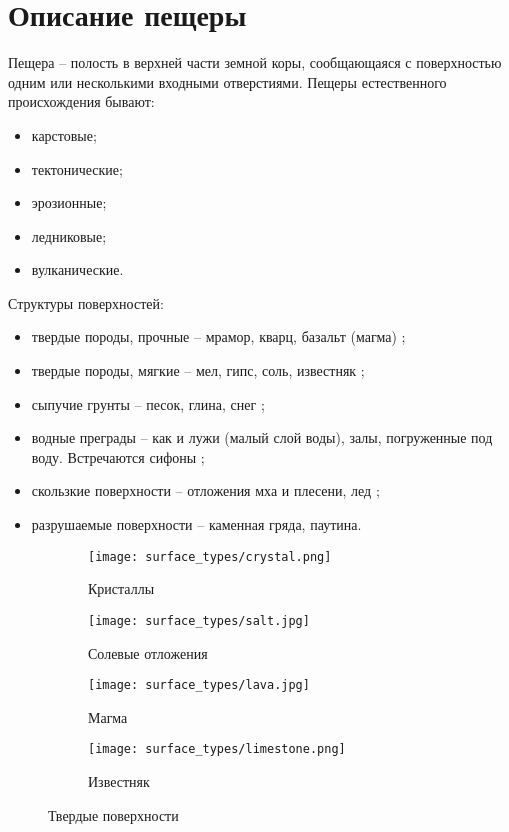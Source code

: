 \section{Описание пещеры}
Пещера -- полость в верхней части земной коры, сообщающаяся с поверхностью одним или несколькими входными отверстиями. Пещеры естественного происхождения бывают:
\begin{itemize}
    \item карстовые; 
    \item тектонические;
    \item эрозионные;
    \item ледниковые;
    \item вулканические.
\end{itemize}

Структуры поверхностей:
\begin{itemize}
    \item твердые породы, прочные -- мрамор, кварц, базальт (магма) ;
    \item твердые породы, мягкие -- мел, гипс, соль, известняк ;
    \item сыпучие грунты -- песок, глина, снег ;
    \item водные преграды -- как и лужи (малый слой воды), залы, погруженные под воду. Встречаются сифоны ;
    \item скользкие поверхности -- отложения мха и плесени, лед ;
    \item разрушаемые поверхности -- каменная гряда, паутина.
\end{itemize}


\begin{figure}[H]
\begin{subfigure}{0.49\textwidth}
\texttt{[image: surface\_types/crystal.png]}\\
\caption{Кристаллы}
\label{fig:crystal}
\end{subfigure}
\begin{subfigure}{0.49\textwidth}
\texttt{[image: surface\_types/salt.jpg]}\\
\caption{Солевые отложения}
\label{fig:salt}
\end{subfigure}

\begin{subfigure}{0.49\textwidth}
\texttt{[image: surface\_types/lava.jpg]}\\
\caption{Магма}
\label{fig:lava}
\end{subfigure}
\begin{subfigure}{0.49\textwidth}
\texttt{[image: surface\_types/limestone.png]}\\
\caption{Известняк}
\label{fig:limestone}
\end{subfigure}
\caption{Твердые поверхности}
\label{fig:solid_surfaces}
\end{figure}

